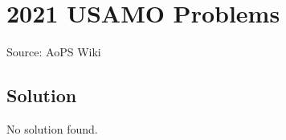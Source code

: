 \documentclass[12pt]{article}
\begin{document}
\section*{{2021 USAMO Problems}}
Source: AoPS Wiki

\subsection*{Solution}
No solution found.
\end{document}
